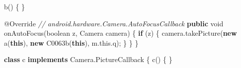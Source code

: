 \documentclass[
]{article}
\newenvironment{Shaded}{}{}
\newcommand{\AttributeTok}[1]{\textcolor[rgb]{0.49,0.56,0.16}{#1}}
\newcommand{\CommentTok}[1]{\textcolor[rgb]{0.38,0.63,0.69}{\textit{#1}}}
\newcommand{\ControlFlowTok}[1]{\textcolor[rgb]{0.00,0.44,0.13}{\textbf{#1}}}
\newcommand{\DataTypeTok}[1]{\textcolor[rgb]{0.56,0.13,0.00}{#1}}
\newcommand{\FunctionTok}[1]{\textcolor[rgb]{0.02,0.16,0.49}{#1}}
\newcommand{\KeywordTok}[1]{\textcolor[rgb]{0.00,0.44,0.13}{\textbf{#1}}}
\newcommand{\NormalTok}[1]{#1}
\newcommand{\OperatorTok}[1]{\textcolor[rgb]{0.40,0.40,0.40}{#1}}
\begin{document}
\begin{Shaded}
\begin{Highlighting}[]
        \FunctionTok{b}\OperatorTok{()} \OperatorTok{\{}
        \OperatorTok{\}}

        \AttributeTok{@Override} \CommentTok{// android.hardware.Camera.AutoFocusCallback}
        \KeywordTok{public} \DataTypeTok{void} \FunctionTok{onAutoFocus}\OperatorTok{(}\DataTypeTok{boolean}\NormalTok{ z}\OperatorTok{,}\NormalTok{ Camera camera}\OperatorTok{)} \OperatorTok{\{}
            \ControlFlowTok{if} \OperatorTok{(}\NormalTok{z}\OperatorTok{)} \OperatorTok{\{}
\NormalTok{                camera}\OperatorTok{.}\FunctionTok{takePicture}\OperatorTok{(}\KeywordTok{new} \FunctionTok{a}\OperatorTok{(}\KeywordTok{this}\OperatorTok{),} \KeywordTok{new} \FunctionTok{C0063b}\OperatorTok{(}\KeywordTok{this}\OperatorTok{),}\NormalTok{ m}\OperatorTok{.}\FunctionTok{this}\OperatorTok{.}\FunctionTok{q}\OperatorTok{);}
            \OperatorTok{\}}
        \OperatorTok{\}}
    \OperatorTok{\}}

    \KeywordTok{class}\NormalTok{ c }\KeywordTok{implements}\NormalTok{ Camera}\OperatorTok{.}\FunctionTok{PictureCallback} \OperatorTok{\{}
        \FunctionTok{c}\OperatorTok{()} \OperatorTok{\{}
        \OperatorTok{\}}


\end{Highlighting}
\end{Shaded}
\end{document}
